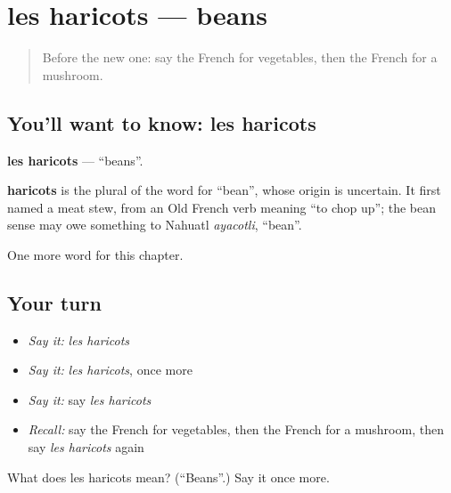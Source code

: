 \section[les haricots]{les haricots — beans}

\label{lesson:FR-C119-haricots}



\begin{quote}
Before the new one: say the French for vegetables, then the French for a mushroom.
\end{quote}

\subsection*{You'll want to know: les haricots}
\textbf{les haricots} — \textquotedblleft{}beans\textquotedblright{}.

\begin{cousinweb}
\textbf{haricots} is the plural of the word for \textquotedblleft{}bean\textquotedblright{}, whose origin is uncertain. It first named a meat stew, from an Old French verb meaning \textquotedblleft{}to chop up\textquotedblright{}; the bean sense may owe something to Nahuatl \emph{ayacotli}, \textquotedblleft{}bean\textquotedblright{}.
\end{cousinweb}

\begin{grammarlens}[title={What you've built}]
One more word for this chapter.
\end{grammarlens}

\subsection*{Your turn}
\begin{itemize}
\raggedright
  \item \emph{Say it:} \emph{les haricots}
  \item \emph{Say it:} \emph{les haricots}, once more
  \item \emph{Say it:} say \emph{les haricots}
  \item \emph{Recall:} say the French for vegetables, then the French for a mushroom, then say \emph{les haricots} again
\end{itemize}

\begin{tcolorbox}[breakable,colback=teal!4,colframe=teal!35!black,title={Before you move on}]
What does les haricots mean? (\textquotedblleft{}Beans\textquotedblright{}.) Say it once more.
\end{tcolorbox}
